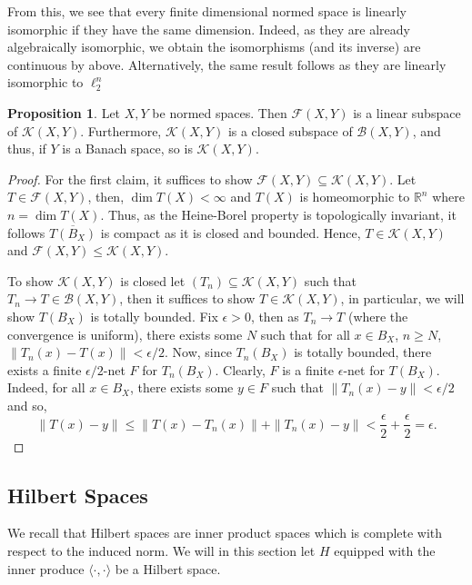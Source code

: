 \documentclass[
]{article}
\theoremstyle{definition}
\theoremstyle{definition}
\newtheorem{proposition}{Proposition}[section]
\begin{document}
From this, we see that every finite dimensional normed space is linearly isomorphic 
if they have the same dimension. Indeed, as they are already algebraically 
isomorphic, we obtain the isomorphisms (and its inverse) are continuous by 
above. Alternatively, the same result follows as they are linearly isomorphic to 
\(\ell^n_2\)

\begin{proposition}
  Let \(X, Y\) be normed spaces. Then \(\mathcal{F}(X, Y)\) is a linear subspace 
  of \(\mathcal{K}(X, Y)\). Furthermore, \(\mathcal{K}(X, Y)\) is a closed subspace 
  of \(\mathcal{B}(X, Y)\), and thus, if \(Y\) is a Banach space, so is 
  \(\mathcal{K}(X, Y)\).
\end{proposition}
\begin{proof}
  For the first claim, it suffices to show \(\mathcal{F}(X, Y) \subseteq 
  \mathcal{K}(X, Y)\). Let \(T \in \mathcal{F}(X, Y)\), then, 
  \(\dim T(X) < \infty\) and \(T(X)\) is homeomorphic to \(\mathbb{R}^n\) 
  where \(n = \dim T(X)\). Thus, as the Heine-Borel property is topologically 
  invariant, it follows \(\overline{T(B_X)}\) is compact as it is closed and 
  bounded. Hence, \(T \in \mathcal{K}(X, Y)\) and \(\mathcal{F}(X, Y) \le 
  \mathcal{K}(X, Y)\).

  To show \(\mathcal{K}(X, Y)\) is closed let \((T_n) \subseteq \mathcal{K}(X, Y)\) 
  such that \(T_n \to T \in \mathcal{B}(X, Y)\), then it suffices to show 
  \(T \in \mathcal{K}(X, Y)\), in particular, we will show \(T(B_X)\) is totally 
  bounded. Fix \(\epsilon > 0\), then as \(T_n \to T\) (where the convergence is 
  uniform), there exists some \(N\) such that for all \(x \in B_X\), \(n \ge N\), 
  \(\|T_n(x) - T(x)\| < \epsilon / 2\). Now, since \(T_n(B_X)\) is totally 
  bounded, there exists a finite \(\epsilon / 2\)-net \(F\) for \(T_n(B_X)\). 
  Clearly, \(F\) is a finite \(\epsilon\)-net for \(T(B_X)\). Indeed, for all 
  \(x \in B_X\), there exists some \(y \in F\) such that \(\|T_n(x) - y\| < 
  \epsilon / 2\) and so, 
  \[\|T(x) - y\| \le \|T(x) - T_n(x)\| + \|T_n(x) - y\| < \frac{\epsilon}{2}
    + \frac{\epsilon}{2} = \epsilon.\]
\end{proof}

\subsection{Hilbert Spaces}

We recall that Hilbert spaces are inner product spaces which is complete with 
respect to the induced norm. We will in this section let \(H\) equipped with 
the inner produce \(\langle \cdot, \cdot \rangle\) be a Hilbert space.
\end{document}
